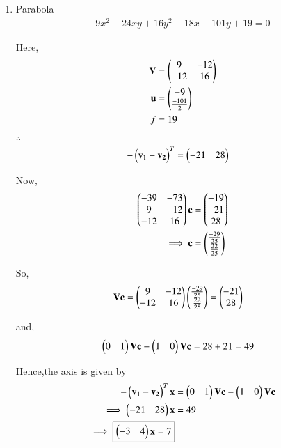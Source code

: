 \documentclass[journal,12pt,twocolumn]{IEEEtran}
\begin{document}
\begin{enumerate}
    \item Parabola
    \begin{align}
    9x^2-24xy+16y^2-18x-101y+19 = 0
    \end{align}
    
    Here,
    \begin{align}
    \mathbf{V} &= \begin{pmatrix}9 & -12 \\ -12 & 16\end{pmatrix} \\
    \mathbf{u} &= \begin{pmatrix}-9 \\ \frac{-101}{2}\end{pmatrix} \\
    f &= 19
    \end{align}

    $\therefore$
    \begin{align}
    -\begin{pmatrix}\mathbf{v_1}-\mathbf{v_2}\end{pmatrix}^T &= \begin{pmatrix}-21 & 28\end{pmatrix}
    \end{align}

    Now,
    \begin{align}
    \begin{pmatrix}-39 & -73 \\ 9 & -12 \\ -12 & 16\end{pmatrix}\mathbf{c} &= \begin{pmatrix}-19 \\ -21 \\ 28\end{pmatrix}
    \\
    \implies \mathbf{c} &= \begin{pmatrix}\frac{-29}{25} \\ \frac{22}{25}\end{pmatrix}
    \end{align}

    So,
    \begin{align}
    \mathbf{V}\mathbf{c} &= \begin{pmatrix}9 & -12 \\ -12 & 16\end{pmatrix}\begin{pmatrix}\frac{-29}{25} \\ \frac{22}{25}\end{pmatrix}=\begin{pmatrix}-21 \\ 28\end{pmatrix}
    \end{align}

    and,
    \begin{align}
    \begin{pmatrix}0 & 1\end{pmatrix}\mathbf{V}\mathbf{c} - \begin{pmatrix}1&0\end{pmatrix}\mathbf{V}\mathbf{c} &= 28+21=49
    \end{align}

    Hence,the axis is given by
    \begin{align}
    -\begin{pmatrix}\mathbf{v_1}-\mathbf{v_2}\end{pmatrix}^T\mathbf{x} &= \begin{pmatrix}0 & 1\end{pmatrix}\mathbf{V}\mathbf{c} - \begin{pmatrix}1 & 0\end{pmatrix}\mathbf{V}\mathbf{c} \\
    \implies \begin{pmatrix}-21 & 28\end{pmatrix}\mathbf{x} &= 49
    \\
    \implies \boxed{\begin{pmatrix}-3 & 4\end{pmatrix}\mathbf{x} = 7}
    \end{align}
    

\end{enumerate}
\end{document}
